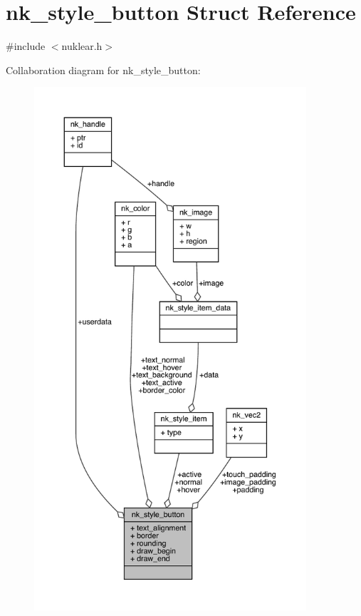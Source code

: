 \hypertarget{structnk__style__button}{}\section{nk\+\_\+style\+\_\+button Struct Reference}
\label{structnk__style__button}


{\ttfamily \#include $<$nuklear.\+h$>$}



Collaboration diagram for nk\+\_\+style\+\_\+button\+:
\nopagebreak
\begin{figure}[H]
\begin{center}
\leavevmode
\includegraphics[height=550pt]{structnk__style__button__coll__graph}
\end{center}
\end{figure}
